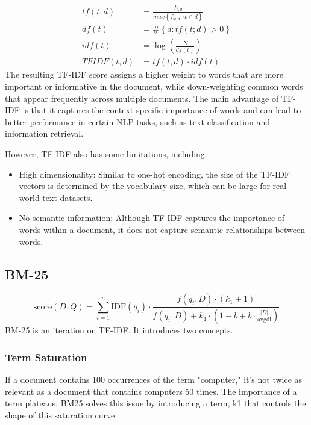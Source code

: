\documentclass[12pt]{article}
\begin{document}
\begin{align*}
tf(t,d) &= \frac{f_{t,d}}{ max\left\{f_{w,d}: w \in d\right\}}\\
df(t) &= \# \left\{ d: tf(t;d) > 0 \right\} \\
idf(t) &= \log\left(\frac{N}{df(t)}\right) \\
TFIDF(t,d) &= tf(t,d)\cdot idf(t)
\end{align*}
The resulting TF-IDF score assigns a higher weight to words that are more important or informative in the document, while down-weighting common words that appear frequently across multiple documents. The main advantage of TF-IDF is that it captures the context-specific importance of words and can lead to better performance in certain NLP tasks, such as text classification and information retrieval.

However, TF-IDF also has some limitations, including:

\begin{itemize}
\item High dimensionality: Similar to one-hot encoding, the size of the TF-IDF vectors is determined by the vocabulary size, which can be large for real-world text datasets.

\item No semantic information: Although TF-IDF captures the importance of words within a document, it does not capture semantic relationships between words.
\end{itemize}


\subsection{BM-25}
\begin{equation} \label{eq:bm25} \text{score}(D,Q) = \sum_{i=1}^{n} \text{IDF}(q_i) \cdot \frac{f(q_i, D) \cdot (k_1 + 1)}{f(q_i, D) + k_1 \cdot (1 - b + b \cdot \frac{|D|}{\text{avgdl}})} \end{equation}
BM-25 is an iteration on TF-IDF. It introduces two concepts.

\subsubsection{Term Saturation}
If a document contains 100 occurrences of the term "computer," it's not twice as relevant as a document that contains computers 50 times. The importance of a term plateaus. BM25 solves this issue by introducing a term, k1 that controls the shape of this saturation curve.
\end{document}
